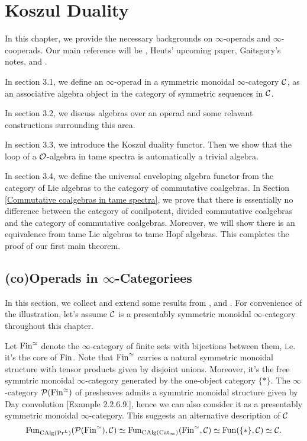 \chapter{Koszul Duality}

In this chapter, we provide the necessary backgrounds on $\infty$-operads and $\infty$-cooperads.
Our main reference will be \cite{BrantnerPhD},  Heuts' upcoming paper, Gaitsgory's notes, \cite{Hadrianphdthesis} and \cite{HA}.
 
In section 3.1, we define an $\infty$-operad in a symmetric monoidal $\infty$-category ${\mathcal{C}}$, as an associative algebra object in the category of symmetric sequences in ${\mathcal{C}}$.

In section 3.2, we discuss algebras over an operad and some relavant constructions surrounding this area. 

In section 3.3, we introduce the Koszul duality functor. Then we show that the loop of a ${\mathcal{O}}$-algebra in tame spectra is automatically a trivial algebra.

In section 3.4, we define the universal enveloping algebra functor from the category of Lie algebras to the category of commutative coalgebras. 
In Section \ref{Commutative coalgebras in tame spectra}, we prove that there is essentially no difference between the category of conilpotent, divided commutative coalgebras and the category of commutative coalgebras.
Moreover, we will show there is an equivalence from tame Lie algebras to tame Hopf algebras. This completes the proof of our first main theorem.

\section{(co)Operads in $\infty$-Categoriees}
In this section, we collect and extend some results from \cite{Francis-Gaitsgory}, \cite{HA} and \cite{HeutsSurvey}.
For convenience of the illustration, let's assume ${\mathcal{C}}$ is a presentably symmetric monoidal $\infty$-category throughout this chapter.

Let $\operatorname{Fin}^{\simeq}$ denote the $\infty$-category of finite sets with bijections between them, i.e. it's the core of $\operatorname{Fin}$. 
Note that $\operatorname{Fin}^{\simeq}$ carries a natural symmetric monoidal structure with tensor products given by disjoint unions. 
Moreover, it's the free symmtric monoidal $\infty$-category generated by the one-object category $\{*\}$.
The $\infty$-category ${\mathcal{P}}(\operatorname{Fin}^{\simeq})$ of presheaves admits a symmtric monoidal structure given by Day convolution \cite{HA}[Example 2.2.6.9.], hence we can also consider it as a presentably symmetric monoidal $\infty$-category. This suggests an alternative description of ${\mathcal{C}}$
\[
\operatorname{Fun}_{\operatorname{CAlg}(\Pr^L)}({\mathcal{P}}(\operatorname{Fin}^{\simeq}), {\mathcal{C}}) 
\simeq 
\operatorname{Fun}_{\operatorname{CAlg}(\operatorname{Cat}_{\infty})} (\operatorname{Fin}^{\simeq}, {\mathcal{C}})
\simeq
\operatorname{Fun}(\{*\}, {\mathcal{C}})
\simeq 
{\mathcal{C}}.
\]


